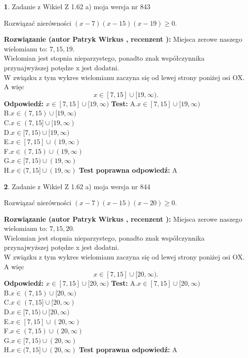 \documentclass[12pt, a4paper]{article}
\theoremstyle{definition} %
\newtheorem{zad}{}
\newcommand{\zadStart}[1]{\begin{zad}#1\newline}
\newcommand{\zadStop}{\end{zad}}
\newcommand{\rozwStart}[2]{\noindent \textbf{Rozwiązanie (autor #1 , recenzent #2): }\newline}
\newcommand{\rozwStop}{\newline}
\newcommand{\odpStart}{\noindent \textbf{Odpowiedź:}\newline}
\newcommand{\odpStop}{\newline}
\newcommand{\testStart}{\noindent \textbf{Test:}\newline}
\newcommand{\testStop}{\newline}
\newcommand{\kluczStart}{\noindent \textbf{Test poprawna odpowiedź:}\newline}
\newcommand{\kluczStop}{\newline}
\begin{document}
\zadStart{Zadanie z Wikieł Z 1.62 a) moja wersja nr 843}

Rozwiązać nierówności $(x-7)(x-15)(x-19)\ge0$.
\zadStop
\rozwStart{Patryk Wirkus}{}
Miejsca zerowe naszego wielomianu to: $7, 15, 19$.\\
Wielomian jest stopnia nieparzystego, ponadto znak współczynnika przy\linebreak najwyższej potędze x jest dodatni.\\ W związku z tym wykres wielomianu zaczyna się od lewej strony poniżej osi OX. A więc $$x \in [7,15] \cup [19,\infty).$$
\rozwStop
\odpStart
$x \in [7,15] \cup [19,\infty)$
\odpStop
\testStart
A.$x \in [7,15] \cup [19,\infty)$\\
B.$x \in (7,15) \cup [19,\infty)$\\
C.$x \in (7,15] \cup [19,\infty)$\\
D.$x \in [7,15) \cup [19,\infty)$\\
E.$x \in [7,15] \cup (19,\infty)$\\
F.$x \in (7,15) \cup (19,\infty)$\\
G.$x \in [7,15) \cup (19,\infty)$\\
H.$x \in (7,15] \cup (19,\infty)$
\testStop
\kluczStart
A
\kluczStop



\zadStart{Zadanie z Wikieł Z 1.62 a) moja wersja nr 844}

Rozwiązać nierówności $(x-7)(x-15)(x-20)\ge0$.
\zadStop
\rozwStart{Patryk Wirkus}{}
Miejsca zerowe naszego wielomianu to: $7, 15, 20$.\\
Wielomian jest stopnia nieparzystego, ponadto znak współczynnika przy\linebreak najwyższej potędze x jest dodatni.\\ W związku z tym wykres wielomianu zaczyna się od lewej strony poniżej osi OX. A więc $$x \in [7,15] \cup [20,\infty).$$
\rozwStop
\odpStart
$x \in [7,15] \cup [20,\infty)$
\odpStop
\testStart
A.$x \in [7,15] \cup [20,\infty)$\\
B.$x \in (7,15) \cup [20,\infty)$\\
C.$x \in (7,15] \cup [20,\infty)$\\
D.$x \in [7,15) \cup [20,\infty)$\\
E.$x \in [7,15] \cup (20,\infty)$\\
F.$x \in (7,15) \cup (20,\infty)$\\
G.$x \in [7,15) \cup (20,\infty)$\\
H.$x \in (7,15] \cup (20,\infty)$
\testStop
\kluczStart
A
\kluczStop
\end{document}

